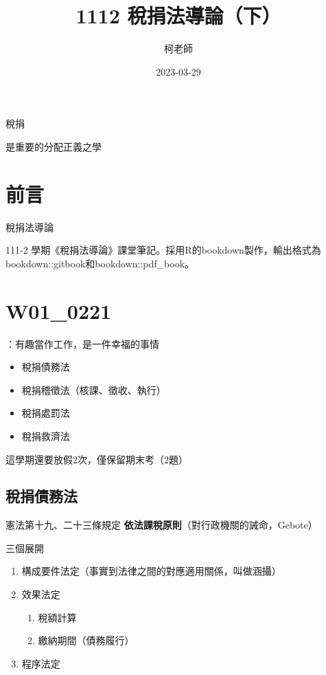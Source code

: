 \documentclass[]{ctexbook}
\title{1112 稅捐法導論（下）}
\author{柯老師}
\date{2023-03-29}
\providecommand{\tightlist}{%
  \setlength{\itemsep}{0pt}\setlength{\parskip}{0pt}}
\begin{document}
\maketitle


\thispagestyle{empty}

\begin{center}
稅捐

是重要的分配正義之學
\end{center}

\setlength{\abovedisplayskip}{-5pt}
\setlength{\abovedisplayshortskip}{-5pt}

{
\setcounter{tocdepth}{2}
\tableofcontents
}
\listoftables
\listoffigures
\hypertarget{ux524dux8a00}{%
\chapter*{前言}\label{ux524dux8a00}}


稅捐法導論

111-2 學期《稅捐法導論》課堂筆記。採用R的bookdown製作，輸出格式為bookdown::gitbook和bookdown::pdf\_book。

\mainmatter

\hypertarget{ux7b2cux4e00ux5468}{%
\chapter{W01\_0221}\label{ux7b2cux4e00ux5468}}

：有趣當作工作，是一件幸福的事情

\begin{itemize}
\tightlist
\item
  稅捐債務法
\item
  稅捐稽徵法（核課、徵收、執行）
\item
  稅捐處罰法
\item
  稅捐救濟法
\end{itemize}

這學期還要放假2次，僅保留期末考（2題）

\hypertarget{ux7a05ux6350ux50b5ux52d9ux6cd5}{%
\section{稅捐債務法}\label{ux7a05ux6350ux50b5ux52d9ux6cd5}}

憲法第十九、二十三條規定
\textbf{依法課稅原則}（對行政機關的誡命，Gebote）

三個展開

\begin{enumerate}
\def\labelenumi{\arabic{enumi}.}
\tightlist
\item
  構成要件法定（事實到法律之間的對應適用關係，叫做涵攝）
\item
  效果法定

  \begin{enumerate}
  \def\labelenumii{\arabic{enumii}.}
  \tightlist
  \item
    稅額計算
  \item
    繳納期間（債務履行）
  \end{enumerate}
\item
  程序法定
\end{enumerate}
\end{document}
